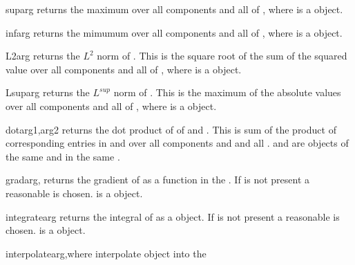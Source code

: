 \begin{funcdesc}{sup}{arg}
returns the maximum over all components and all 
\DataSamplePoints of , where 
is a \Data object. 
\end{funcdesc}

\begin{funcdesc}{inf}{arg}
returns the mimumum over all components and all 
\DataSamplePoints of , where 
is a \Data object. 
\end{funcdesc}

\begin{funcdesc}{L2}{arg}
returns the $L^2$ norm of . This is the square root 
of the sum of the squared value over all components and all 
\DataSamplePoints of , where 
is a \Data object. 
\end{funcdesc}

\begin{funcdesc}{Lsup}{arg}
returns the $L^{sup}$ norm of . This is the maximum of the absolute values
 over all components and all 
\DataSamplePoints of , where 
is a \Data object. 
\end{funcdesc}

\begin{funcdesc}{dot}{arg1,arg2}
returns the dot product of of  and . This is sum
of the product of corresponding entries in  and  over all
components and and all 
\DataSamplePoints.  and  are \Data objects of the
same \Shape and in the same \FunctionSpace.
\end{funcdesc}

\begin{funcdesc}{grad}{arg,}
returns the gradient of  as a function in the \FunctionSpace {}.
If  is not present a reasonable \FunctionSpace is chosen.
is a \Data object. 
\end{funcdesc}

\begin{funcdesc}{integrate}{arg}
returns the integral of  as a \numarray object.
If  is not present a reasonable \FunctionSpace is chosen.
is a \Data object. 
\end{funcdesc}

\begin{funcdesc}{interpolate}{arg,where}
interpolate \Data object  into the \FunctionSpace {}
\end{funcdesc}


